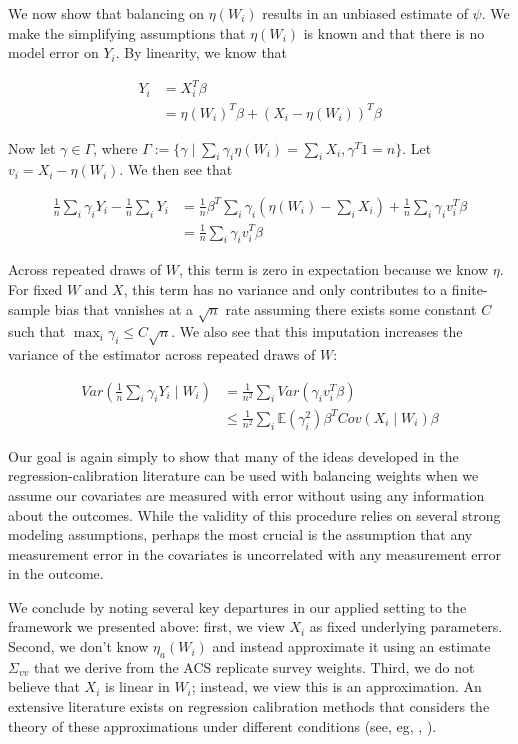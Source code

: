 \documentclass[12pt]{article}
\begin{document}
We now show that balancing on $\eta(W_i)$ results in an unbiased estimate of $\psi$. We make the simplifying assumptions that $\eta(W_i)$ is known and that there is no model error on $Y_i$. By linearity, we know that

\begin{align*}
Y_i &= X_i^T\beta \\
&= \eta(W_i)^T\beta + (X_i - \eta(W_i))^T\beta
\end{align*}

Now let $\gamma \in \Gamma$, where $\Gamma := \{\gamma \mid \sum_i \gamma_i \eta(W_i) = \sum_i X_i, \gamma^T1 = n\}$. Let $v_i = X_i - \eta(W_i)$. We then see that

\begin{align*}
    \frac{1}{n}\sum_{i}\gamma_{i}Y_{i} - \frac{1}{n}\sum_{i}Y_{i} &= \frac{1}{n}\beta^T\sum_{i}\gamma_{i}(\eta(W_i) - \sum_{i}X_{i}) + \frac{1}{n}\sum_i \gamma_iv_i^T\beta \\
    &= \frac{1}{n}\sum_i \gamma_iv_i^T\beta
\end{align*}

Across repeated draws of $W$, this term is zero in expectation because we know $\eta$. For fixed $W$ and $X$, this term has no variance and only contributes to a finite-sample bias that vanishes at a $\sqrt{n}$ rate assuming there exists some constant $C$ such that $\max_i \gamma_i \le C\sqrt{n}$. We also see that this imputation increases the variance of the estimator across repeated draws of $W$:

\begin{align*}
    Var(\frac{1}{n}\sum_i \gamma_i Y_i \mid W_i) &= \frac{1}{n^2}\sum_i Var(\gamma_iv_i^T\beta) \\
    &\le \frac{1}{n^2}\sum_i\mathbb{E}(\gamma_i^2)\beta^TCov(X_i \mid W_i)\beta 
\end{align*}

Our goal is again simply to show that many of the ideas developed in the regression-calibration literature can be used with balancing weights when we assume our covariates are measured with error without using any information about the outcomes. While the validity of this procedure relies on several strong modeling assumptions, perhaps the most crucial is the assumption that any measurement error in the covariates is uncorrelated with any measurement error in the outcome. 

We conclude by noting several key departures in our applied setting to the framework we presented above: first, we view $X_i$ as fixed underlying parameters. Second, we don't know $\eta_a(W_i)$ and instead approximate it using an estimate $\Sigma_{vv}$ that we derive from the ACS replicate survey weights. Third, we do not believe that $X_i$ is linear in $W_i$; instead, we view this is an approximation. An extensive literature exists on regression calibration methods that considers the theory of these approximations under different conditions (see, eg, \cite{gleser1992importance}, \cite{carroll2006measurement}).
\end{document}
